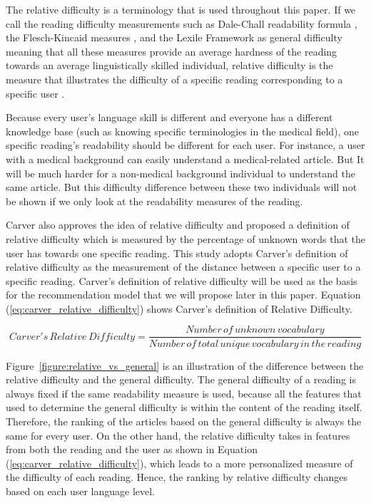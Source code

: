 The relative difficulty is a terminology that is used throughout this paper. If we call the reading difficulty measurements such as Dale-Chall readability formula \cite{DaleChall1995, DaleChall1948}, the Flesch-Kincaid measures \cite{Kincaid1975}, and the Lexile Framework \cite{Lexile1996} as general difficulty meaning that all these measures provide an average hardness of the reading towards an average linguistically skilled individual, relative difficulty is the measure that illustrates the difficulty of a specific reading corresponding to a specific user \cite{Carver1994}.

Because every user's language skill is different and everyone has a different knowledge base (such as knowing specific terminologies in the medical field), one specific reading's readability should be different for each user. For instance, a user with a medical background can easily understand a medical-related article. But It will be much harder for a non-medical background individual to understand the same article. But this difficulty difference between these two individuals will not be shown if we only look at the readability measures of the reading.

Carver \cite{Carver1994} also approves the idea of relative difficulty and proposed a definition of relative difficulty which is measured by the percentage of unknown words that the user has towards one specific reading. This study adopts Carver's definition of relative difficulty as the measurement of the distance between a specific user to a specific reading. Carver's definition of relative difficulty will be used as the basis for the recommendation model that we will propose later in this paper. Equation (\ref{eq:carver_relative_difficulty}) shows Carver's definition of Relative Difficulty.

\begin{equation}\label{eq:carver_relative_difficulty}
   Carver's \, Relative \, Difficulty = \frac{Number \, of \, unknown \, vocabulary}{Number \, of \, total \, unique \,vocabulary \, in \, the \, reading}
\end{equation}

Figure~\ref{figure:relative_vs_general} is an illustration of the difference between the relative difficulty and the general difficulty. The general difficulty of a reading is always fixed if the same readability measure is used, because all the features that used to determine the general difficulty is within the content of the reading itself. Therefore, the ranking of the articles based on the general difficulty is always the same for every user. On the other hand, the relative difficulty takes in features from both the reading and the user as shown in Equation (\ref{eq:carver_relative_difficulty}), which leads to a more personalized measure of the difficulty of each reading. Hence, the ranking by relative difficulty changes based on each user language level. 

